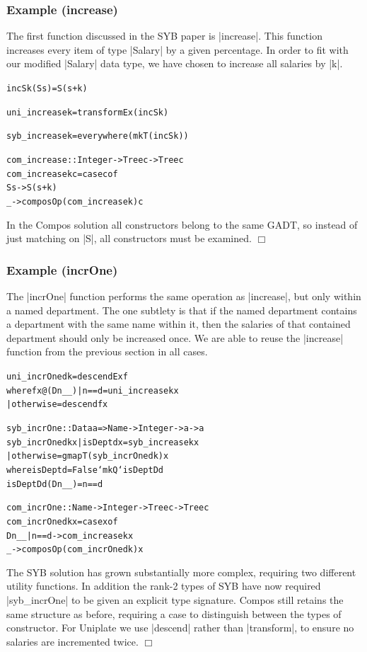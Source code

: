 \documentclass[preprint]{sigplanconf}
\newcounter{exmp}
\newcommand{\noexample}{\hfill$\Box$}
\newenvironment{code}{\begin{alltt}\small}{\end{alltt}}
\newenvironment{examplename}[1]
    {\subsubsection*{Example \arabic{exmp} (#1)}\refstepcounter{exmp}}
    {\noexample}
\newcommand{\ignore}{}
\begin{document}
\begin{examplename}{increase}

The first function discussed in the SYB paper is |increase|. This function increases every item of type |Salary| by a given percentage. In order to fit with our modified |Salary| data type, we have chosen to increase all salaries by |k|.

\ignore\begin{code}
incS k (S s) = S (s + k)

uni_increase k = transformEx (incS k)

syb_increase k = everywhere (mkT (incS k))

com_increase :: Integer -> Tree c -> Tree c
com_increase k c = case c of
    S s -> S (s + k)
    _ -> composOp (com_increase k) c
\end{code}

In the Compos solution all constructors belong to the same GADT, so instead of just matching on |S|, all constructors must be examined.
\end{examplename}

\begin{examplename}{incrOne}

The |incrOne| function performs the same operation as |increase|, but only within a named department. The one subtlety is that if the named department contains a department with the same name within it, then the salaries of that contained department should only be increased once. We are able to reuse the |increase| function from the previous section in all cases.

\ignore\begin{code}
uni_incrOne d k = descendEx f
    where f x@(D n _ _)  | n == d     = uni_increase k x
                         | otherwise  = descend f x

syb_incrOne :: Data a => Name -> Integer -> a -> a
syb_incrOne d k x  | isDept d x  = syb_increase k x
                   | otherwise   = gmapT (syb_incrOne d k) x
    where  isDept   d = False `mkQ` isDeptD d
           isDeptD  d (D n _ _) = n == d

com_incrOne :: Name -> Integer -> Tree c -> Tree c
com_incrOne d k x = case x of
    D n _ _ | n == d -> com_increase k x
    _ -> composOp (com_incrOne d k) x
\end{code}

The SYB solution has grown substantially more complex, requiring two different utility functions. In addition the rank-2 types of SYB have now required |syb_incrOne| to be given an explicit type signature. Compos still retains the same structure as before, requiring a case to distinguish between the types of constructor. For Uniplate we use |descend| rather than |transform|, to ensure no salaries are incremented twice.
\end{examplename}
\end{document}
